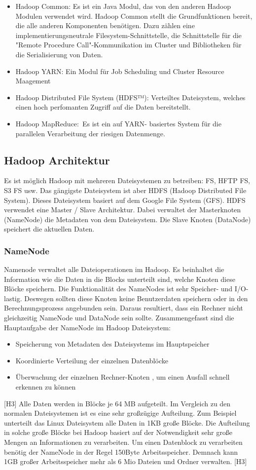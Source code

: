 \begin{itemize}
\item Hadoop Common: Es ist ein Java Modul, das von den anderen Hadoop Modulen verwendet wird. Hadoop Common stellt die Grundfunktionen bereit, die alle anderen Komponenten benötigen. Dazu zählen eine implementierungsneutrale Filesystem-Schnittstelle, die Schnittstelle für die "Remote Procedure Call"-Kommunikation im Cluster und Bibliotheken für die Serialisierung von Daten.
\item Hadoop YARN: Ein Modul für Job Scheduling und Cluster Resource Maagement
\item Hadoop Distributed File System (HDFS™): Verteiltes Dateisystem, welches einen hoch perfomanten Zugriff auf die Daten bereitstellt.
\item Hadoop MapReduce: Es ist ein auf YARN- basiertes System für die parallelen Verarbeitung der riesigen Datenmenge.
\end{itemize}
\subsection{Hadoop Architektur}
Es ist möglich Hadoop mit mehreren Dateisystemen zu betreiben: FS, HFTP FS, S3 FS usw. Das gängigste Dateisystem ist aber HDFS (Hadoop Distributed File System). Dieses Dateisystem basiert auf dem Google File System (GFS). 
HDFS verwendet eine Master / Slave Architektur. Dabei verwaltet der Masterknoten (NameNode) die Metadaten von dem Dateisystem. Die Slave Knoten (DataNode) speichert die aktuellen Daten.
\subsubsection{NameNode}
Namenode verwaltet alle Dateioperationen im Hadoop. Es beinhaltet die Information wie die Daten in die Blocks unterteilt sind, welche Knoten diese Blöcke speichern.
Die Funktionalität des NameNodes ist sehr Speicher- und I/O-lastig. Deswegen sollten diese Knoten keine Benutzerdaten speichern oder in den Berechnungsprozess angebunden sein. Daraus resultiert, dass ein Rechner nicht gleichzeitig NameNode und DataNode sein sollte.
Zusammengefasst sind die Hauptaufgabe der NameNode im Hadoop Dateisystem:
\begin{itemize}
\item Speicherung von Metadaten des Dateisystems im Hauptspeicher
\item Koordinierte Verteilung der einzelnen Datenblöcke
\item Überwachung der einzelnen Rechner-Knoten , um einen Ausfall schnell erkennen zu können 
\end{itemize}
[H3]
Alle Daten werden in Blöcke je 64 MB aufgeteilt. Im Vergleich zu den normalen Dateisystemen ist es eine sehr großzügige Aufteilung. Zum Beispiel unterteilt das Linux Dateisystem alle Daten in 1KB große Blöcke. Die Aufteilung in solche große Blöcke bei Hadoop basiert auf der Notwendigkeit sehr große Mengen an Informationen zu verarbeiten. Um einen Datenblock zu verarbeiten benötig der NameNode in der Regel 150Byte Arbeitsspeicher. Demnach kann 1GB großer Arbeitsspeicher mehr als 6 Mio Dateien und Ordner verwalten. [H3]
